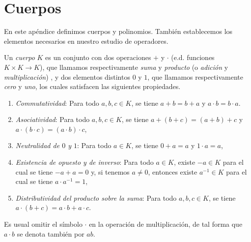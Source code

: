 \appendix

\chapter{Cuerpos}


En este ap\'endice definimos cuerpos y polinomios. Tambi\'en establecemos los elementos necesarios en nuestro estudio de operadores. 

\begin{defn}\label{defcuerpo}
Un \emph{cuerpo} $K$ es un conjunto con dos operaciones $+$ y $\cdot$ (e.d. funciones $K\times K\rightarrow K$), que llamamos respectivamente \emph{suma} y \emph{producto} (o \emph{adici\'on} y \emph{multiplicaci\'on}) , y dos elementos distintos $0$ y $1$, que llamamos respectivamente \emph{cero} y \emph{uno}, los cuales satisfacen las siguientes propiedades.
\begin{enumerate}
\item \emph{Commutatividad}: Para todo $a,b,c\in K$, se tiene $a+b=b+a$ y $a\cdot b=b\cdot a$.
\item \emph{Asociatividad}: Para todo $a,b,c\in K$, se tiene $a+(b+c)=(a+b)+c$ y $a\cdot(b\cdot c)=(a\cdot b)\cdot c$,
\item \emph{Neutralidad de $0$ y $1$}: Para todo $a\in K$, se tiene $0+a=a$ y $1\cdot a=a$,
\item \emph{Existencia de opuesto y de inverso}: Para todo $a\in K$, existe $-a\in K$ para el cual se tiene $-a+a=0$ y, si tenemos $a\ne 0$, entonces existe $a^{-1}\in K$ para el cual se tiene $a\cdot a^{-1}=1$,
\item \emph{Distributividad del producto sobre la suma}: Para todo $a,b,c\in K$, se tiene $a\cdot(b+c)=a\cdot b+a\cdot c$. 
\end{enumerate}
\end{defn}

\begin{nota}
Es usual omitir el s\'imbolo $\cdot$ en la operaci\'on de multiplicaci\'on, de tal forma que $a\cdot b$ se denota tambi\'en por $ab$.
\end{nota}

